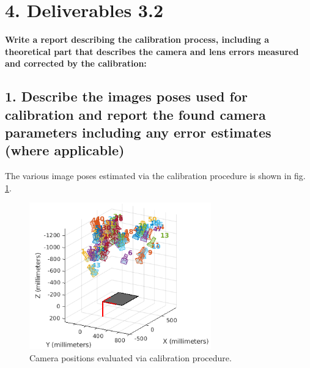 \section*{4. Deliverables 3.2}
\textbf{Write a report describing the calibration process, including a theoretical part that describes the camera and lens errors measured and corrected by the calibration:}
\subsection*{1. Describe the images poses used for calibration and report the found camera parameters including any error estimates (where applicable)}
The various image poses estimated via the calibration procedure is shown in fig. \ref{fig:poses}.
\begin{figure}[H]
\begin{center}
\includegraphics[width=0.7\textwidth]{graphics/camera_positions.png}
\caption{Camera positions evaluated via calibration procedure.}
\label{fig:poses}
\end{center}
\end{figure}

